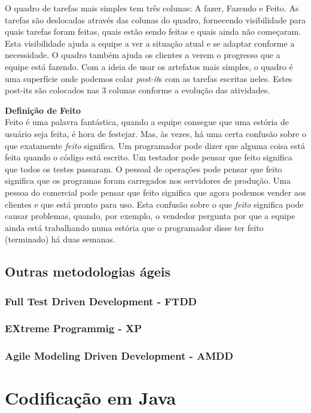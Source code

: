 \documentclass[
	11pt,				%
	openright,
	twoside,			%
	a4paper,			%
	english,			%
	french,
	brazil,				%
	sumario=tradicional
	]{abntex2}
\begin{document}
O quadro de tarefas mais simples tem três colunas: A fazer, Fazendo e Feito. As tarefas são deslocadas através das colunas do quadro, fornecendo visibilidade para quais tarefas foram feitas, quais estão sendo feitas e quais ainda não começaram. Esta visibilidade ajuda a equipe a ver a situação atual e se adaptar conforme a necessidade. O quadro também ajuda os clientes a verem o progresso que a equipe está fazendo. Com a ideia de usar os artefatos mais simples, o quadro é uma superfície onde podemos colar \textit{post-it}s com as tarefas escritas neles. Estes post-its são colocados nas 3 colunas conforme a evolução das atividades.

\parbox{15cm}{
\textbf{Definição de Feito}\\
Feito é uma palavra fantástica, quando a equipe consegue que uma estória de usuário seja feita, é hora de festejar. Mas, às vezes, há uma certa confusão sobre o que exatamente \emph{feito} significa. Um programador pode dizer que alguma coisa está feita quando o código está escrito. Um testador pode pensar que feito significa que todos os testes passaram. O pessoal de operações pode pensar que feito significa que os programas foram carregados nos servidores de produção. Uma pessoa do comercial pode pensar que feito significa que agora podemos vender aos clientes e que está pronto para uso. Esta confusão sobre o que \emph{feito} significa pode causar problemas, quando, por exemplo, o vendedor pergunta por que a equipe ainda está trabalhando numa estória que o programador disse ter feito (terminado) há duas semanas.
}

\section{Outras metodologias ágeis}
\subsection{Full Test Driven Development - FTDD}
\subsection{EXtreme Programmig - XP}
\subsection{Agile Modeling Driven Development - AMDD}

\chapter{Codificação em Java}
\end{document}
